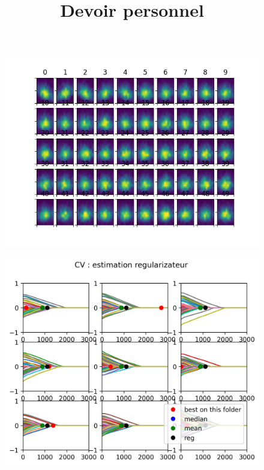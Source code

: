 \documentclass{article}
\date{}
\date{}
\title{Devoir personnel}
\begin{document}
\maketitle

\begin{figure}
\includegraphics[scale=1]{visu_feature.png}
\end{figure}

\clearpage
\begin{figure}
\includegraphics[scale=1]{cv_reg.png}
\end{figure}
\clearpage
\end{document}
